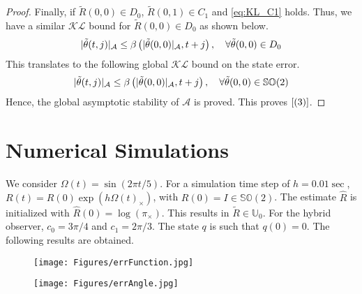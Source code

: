 \documentclass{article}
\newcommand{\SOtwo}{\mathbb{SO}(2)}
\newcommand{\brackets}[1]{\left(#1\right)}
\begin{document}
\begin{proof}
Finally, if $\tilde{R}(0,0)\in D_0$, $\tilde{R}(0,1)\in C_1$ and \eqref{eq:KL_C1} holds. Thus, we have a similar $\mathcal{KL}$ bound for $\tilde{R}(0,0)\in D_0$ as shown below. 
\begin{align}\label{eq:KL_D0}
    |\Tilde{\theta}(t, j)|_\mathcal{A} \leq \beta\brackets{|\tilde{\theta}(0, 0)|_\mathcal{A}, t+j}, \quad \forall \tilde{\theta}(0, 0) \in D_0
\end{align}
This translates to the following global $\mathcal{KL}$ bound on the state error. 
\begin{align}\label{eq:KL_global}
|\Tilde{\theta}(t, j)|_\mathcal{A} \leq \beta\brackets{|\tilde{\theta}(0, 0)|_\mathcal{A}, t+j}, \quad \forall \tilde{\theta}(0, 0) \in \SOtwo
\end{align}
Hence, the global asymptotic stability of $\mathcal{A}$ is proved. This proves $\eqref{(3)}$.
\end{proof}

\section{Numerical Simulations}
We consider $\Omega(t) = \sin\brackets{2\pi t/5}.$ For a simulation time step of $h=0.01 \sec$, $R(t) = R(0)\exp\brackets{h\Omega(t)_\times}$, with $R(0) = I \in \SOtwo$. The estimate $\hat{R}$ is initialized with $\hat{R}(0) = \log\brackets{\pi_\times}$. This results in $\tilde{R}\in \mathbb{U}_0$. For the hybrid observer, $c_0 = 3\pi/4$ and $c_1 = 2\pi/3$. The state $q$ is such that $q(0) = 0$. The following results are obtained.



\begin{figure}[!h]
\centering
\begin{minipage}{.49\textwidth}
  \flushleft
  \texttt{[image: Figures/errFunction.jpg]}
  \label{fig:test1}
\end{minipage}
\begin{minipage}{.49\textwidth}
  \flushleft
  \texttt{[image: Figures/errAngle.jpg]}
  \label{fig:test2}
\end{minipage}
\end{figure}
\end{document}
